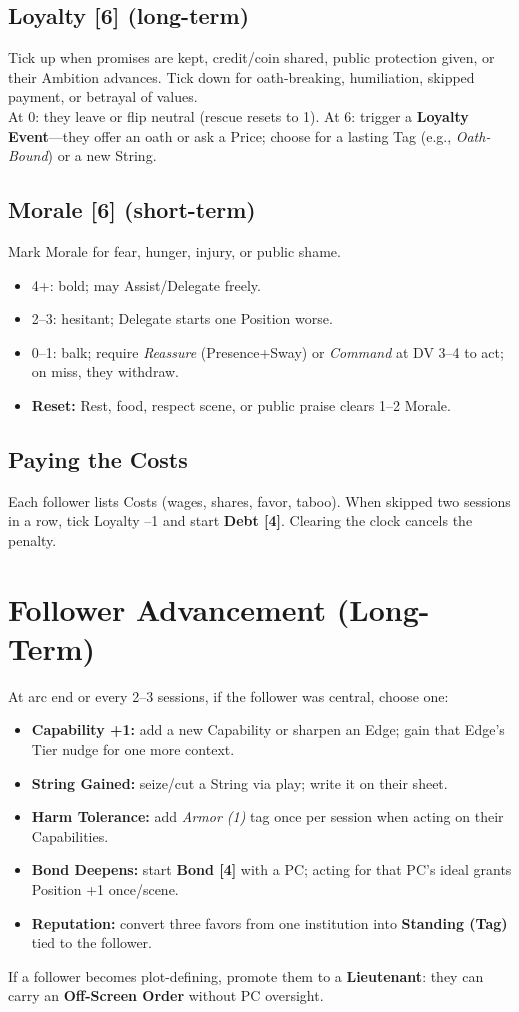 \subsection{Loyalty [6] (long-term)}
Tick up when promises are kept, credit/coin shared, public protection given, or their Ambition advances. Tick down for oath-breaking, humiliation, skipped payment, or betrayal of values.\\
At 0: they leave or flip neutral (rescue resets to 1). At 6: trigger a \textbf{Loyalty Event}---they offer an oath or ask a Price; choose for a lasting Tag (e.g., \emph{Oath-Bound}) or a new String.

\subsection{Morale [6] (short-term)}
Mark Morale for fear, hunger, injury, or public shame.
\begin{itemize}
  \item 4+: bold; may Assist/Delegate freely.
  \item 2--3: hesitant; Delegate starts one Position worse.
  \item 0--1: balk; require \emph{Reassure} (Presence+Sway) or \emph{Command} at DV 3--4 to act; on miss, they withdraw.
  \item \textbf{Reset:} Rest, food, respect scene, or public praise clears 1--2 Morale.
\end{itemize}

\subsection{Paying the Costs}
Each follower lists Costs (wages, shares, favor, taboo). When skipped two sessions in a row, tick Loyalty --1 and start \textbf{Debt [4]}. Clearing the clock cancels the penalty.

\section{Follower Advancement (Long-Term)}
At arc end or every 2--3 sessions, if the follower was central, choose one:
\begin{itemize}
  \item \textbf{Capability +1:} add a new Capability or sharpen an Edge; gain that Edge's Tier nudge for one more context.
  \item \textbf{String Gained:} seize/cut a String via play; write it on their sheet.
  \item \textbf{Harm Tolerance:} add \emph{Armor (1)} tag once per session when acting on their Capabilities.
  \item \textbf{Bond Deepens:} start \textbf{Bond [4]} with a PC; acting for that PC's ideal grants Position +1 once/scene.
  \item \textbf{Reputation:} convert three favors from one institution into \textbf{Standing (Tag)} tied to the follower.
\end{itemize}
If a follower becomes plot-defining, promote them to a \textbf{Lieutenant}: they can carry an \textbf{Off-Screen Order} without PC oversight.

